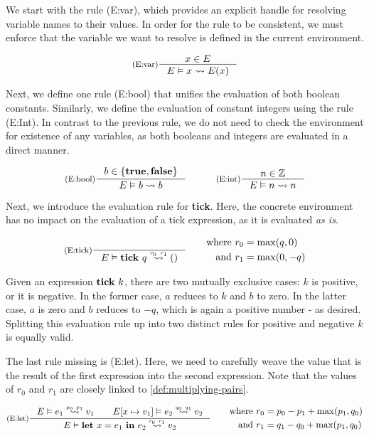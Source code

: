 We start with the rule (E:var), which provides an explicit handle for resolving variable names to their values. In order for the rule to be consistent, we must enforce that the variable we want to resolve is defined in the current environment. 

\[
   \inference[(E:var)]
   {\contains{E}{x}}
   {\evals{E}{x}{E(x)}{}{}}
\]

Next, we define one rule (E:bool) that unifies the evaluation of both boolean constants. Similarly, we define the evaluation of constant integers using the rule (E:Int). In contrast to the previous rule, we do not need to check the environment for existence of any variables, as both booleans and integers are evaluated in a direct manner.

\[
   \inference[(E:bool)]{b \in \{\true, \false\}}{\evals{E}{b}{b}{}{}}%
   \quad\quad\quad
   \inference[(E:int)]{n \in \mathbb{Z}}{\evals{E}{n}{n}{}{}}
\]

Next, we introduce the evaluation rule for \textbf{tick}. Here, the concrete environment has no impact on the evaluation of a tick expression, as it is evaluated \emph{as is}. 

\[
   \inference[(E:tick)]
   {}
   {\evals{E}{\tick{q}}{()}{r_0}{r_1}}%
   \qquad 
   \begin{aligned}
      \text{where }  &r_0 = \max(q, 0)\\
      \text{and }    &r_1 = \max(0, -q) 
   \end{aligned}
\]

Given an expression \(\mathbf{tick}~k\), there are two mutually exclusive cases: \(k\) is positive, or it is negative. In the former case, \(a\) reduces to \(k\) and \(b\) to zero. In the latter case, \(a\) is zero and \(b\) reduces to \(-q\), which is again a positive number - as desired. Splitting this evaluation rule up into two distinct rules for positive and negative \(k\) is equally valid.

The last rule missing is (E:let). Here, we need to carefully weave the value that is the result of the first expression into the second expression. Note that the values of \(r_0\) and \(r_1\) are closely linked to \cref{def:multiplying-pairs}.

\[
   \inference[(E:let)]
   {\evals{E}{e_1}{v_1}{p_0}{p_1} \qquad \evals{\envaugment{E}{x}{v_1}}{e_2}{v_2}{q_0}{q_1}}
   {\evals{E}{\letexp{x}{e_1}{e_2}}{v_2}{r_0}{r_1}}%
   \qquad
   \begin{aligned}
      \text{where }  &r_0 = p_0 - p_1 + \max(p_1, q_0)\\
      \text{and }    &r_1 = q_1 - q_0 + \max(p_1, q_0) 
   \end{aligned}
\]


